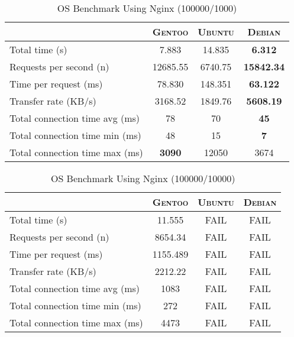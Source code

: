 \begin{table}[ht]
  \centering
  \caption{OS Benchmark Using Nginx (100000/1000)}
  \label{tab:os_nginx_100000_1000}
  
  \begin{tabular}{l|c|c|c}

    & \textbf{\textsc{Gentoo}} & \textbf{\textsc{Ubuntu}} & \textbf{\textsc{Debian}} \\ \hline
    Total time (s) & 7.883 & 14.835 & \textbf{6.312} \\ \hline
    Requests per second (n) & 12685.55 & 6740.75 & \textbf{15842.34} \\ \hline
    Time per request (ms) & 78.830 & 148.351 & \textbf{63.122} \\ \hline
    Transfer rate (KB/s) & 3168.52 & 1849.76 & \textbf{5608.19} \\ \hline
    Total connection time avg (ms) & 78 & 70 & \textbf{45} \\ \hline
    Total connection time min (ms) & 48 & 15 & \textbf{7} \\ \hline
    Total connection time max (ms) & \textbf{3090} & 12050 & 3674 \\
  \end{tabular}
\end{table}

\begin{table}[ht]
  \centering
  \caption{OS Benchmark Using Nginx (100000/10000)}
  \label{tab:os_nginx_100000_10000}
  
  \begin{tabular}{l|c|c|c}

    & \textbf{\textsc{Gentoo}} & \textbf{\textsc{Ubuntu}} & \textbf{\textsc{Debian}} \\ \hline
    Total time (s) & 11.555 & FAIL & FAIL \\ \hline
    Requests per second (n) & 8654.34 & FAIL & FAIL \\ \hline
    Time per request (ms) & 1155.489 & FAIL & FAIL \\ \hline
    Transfer rate (KB/s) & 2212.22 & FAIL & FAIL \\ \hline
    Total connection time avg (ms) & 1083 & FAIL & FAIL \\ \hline
    Total connection time min (ms) & 272 & FAIL & FAIL \\ \hline
    Total connection time max (ms) & 4473 & FAIL & FAIL \\
  \end{tabular}
\end{table}


